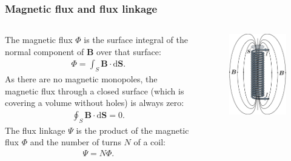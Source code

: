 \begin{frame}
	\frametitle{Magnetic flux and flux linkage}
	\begin{columns}
		\begin{column}{0.575\textwidth}
			The magnetic flux $\Phi$ is the surface integral of the normal component of $\bm{B}$ over that surface:
            \begin{align}
                \Phi = \int_{S} \bm{B} \cdot \mathrm{d}\bm{S}. 
            \end{align}
            As there are no magnetic monopoles, the magnetic flux through a closed surface (which is covering a volume without holes) is always zero:
            \begin{align}
                \oint_{S} \bm{B} \cdot \mathrm{d}\bm{S} = 0.
            \end{align}
            The flux linkage $\Psi$ is the product of the magnetic flux $\Phi$ and the number of turns $N$ of a coil:
            \begin{align}
                \Psi = N  \Phi.
            \end{align}
		\end{column}
        \hfill
		\begin{column}{0.425\textwidth}
            \vspace{-0.2cm}
			\begin{figure}
				\centering
				\includegraphics[height=0.68\textheight]{fig/lec02/Solenoid_Flux.pdf}

\end{figure}
\end{column}
\end{columns}
\end{frame}

